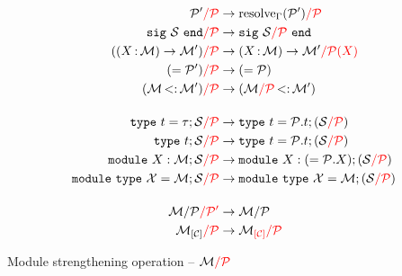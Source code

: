 \begin{align*}
  \Ostrengthen{l}{\iP}{\iP'}
  &\to \Ostrengthen{l}{\iP}{\resolve{\E}{\iP'}}\\
  \Ostrengthen{l}{\iP}{\Ssig{\iS}}
  &\to \Ssig{\Ostrengthen{l}{\iP}{\iS}}\\
  \Ostrengthen{l}{\iP}{(\Sfunctor{\ix}{\iM}{\iM'})}
  &\to \Sfunctor{\ix}{\iM}{\Ostrengthen{l}{\iP(X)}{\iM'}}\\
  \Ostrengthen{l}{\iP}{\Salias{\iP'}}
  &\to \Salias{\iP}\\
  \Ostrengthen{l}{\iP}{\Stransp{\iM}{\iM'}}
  &\to \Stransp{\Ostrengthen{l}{\iP}{\iM}}{\iM'}\\[4mm]
  \Ostrengthen{l}{\iP}{\Stype{t}{\tau};\iS}
  &\to \Stype{t}{\iP.t};(\Ostrengthen{l}{\iP}{\iS}) %
  \\
  \Ostrengthen{l}{\iP}{\Stypeabs{t};\iS}
  &\to \Stype{t}{\iP.t};(\Ostrengthen{l}{\iP}{\iS}) %
  \\
  \Ostrengthen{l}{\iP}{\Smodulety{\ix}{\iM};\iS}
  &\to \Smodulety{\ix}{\Salias{\iP.\ix}};
    (\Ostrengthen{l}{\iP}{\iS}) %
  \\
  \Ostrengthen{l}{\iP}{\Smoduletype{\iX}{\iM};\iS}
  &\to \Smoduletype{\iX}{\iM};
    (\Ostrengthen{l}{\iP}{\iS}) \\[4mm]
  \Ostrengthen{l'}{\iP'}{\Sstrengthen{l}{\iP}{\iM}}
  &\to \Sstrengthen{l}{\iP}{\iM}\\
  \Ostrengthen{l}{\iP}{\Senrich{\iC}{\iM}}
  &\to \Ostrengthen{l}{\iP}{\Oenrich{\iC}{\iM}}\\
\end{align*}\vspace{-3mm}
\caption{Module strengthening operation -- $\Ostrengthen{l}{\iP}{\iM}$}
\label{module:strengthen}

